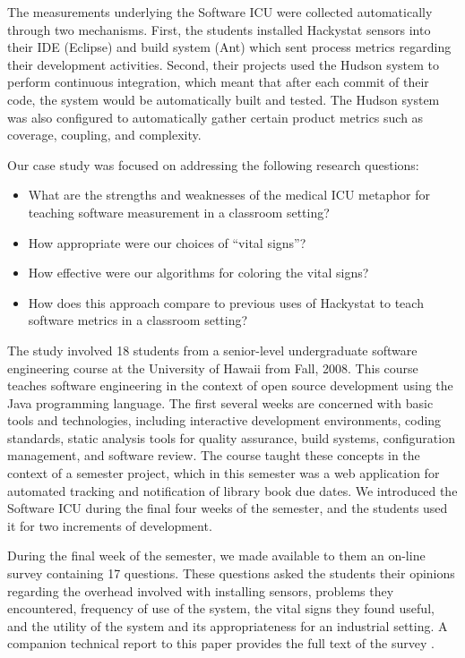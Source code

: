 \documentclass[times,10pt,twocolumn]{article}
\begin{document}
The measurements underlying the Software ICU were collected automatically
through two mechanisms. First, the students installed Hackystat sensors
into their IDE (Eclipse) and build system (Ant) which sent process
metrics regarding their development activities.  Second, their projects
used the Hudson system to perform continuous integration, which meant that
after each commit of their code, the system would be automatically built
and tested.  The Hudson system was also configured to automatically gather
certain product metrics such as coverage, coupling, and complexity.

\label{sec:evaluation}

Our case study was focused on addressing the following research questions: 
\begin{itemize}
\item What are the strengths and weaknesses of the medical ICU metaphor for 
teaching software measurement in a classroom setting? 
\item How appropriate were our choices of ``vital signs''?
\item How effective were our algorithms for coloring the vital signs? 
\item How does this approach compare to previous uses of Hackystat to teach software metrics
in a classroom setting? 
\end{itemize}

The study involved 18 students from a senior-level undergraduate software
engineering course at the University of Hawaii from Fall, 2008. This course
teaches software engineering in the context of open source development
using the Java programming language.  The first several weeks are concerned
with basic tools and technologies, including interactive development
environments, coding standards, static analysis tools for quality
assurance, build systems, configuration management, and software review.
The course taught these concepts in the context of a semester project,
which in this semester was a web application for automated tracking and
notification of library book due dates.  We introduced the Software ICU
during the final four weeks of the semester, and the students used it for
two increments of development.

During the final week of the semester, we made available to them an on-line
survey containing 17 questions.  These questions asked the students their
opinions regarding the overhead involved with installing sensors, problems
they encountered, frequency of use of the system, the vital signs they
found useful, and the utility of the system and its appropriateness for an
industrial setting.  A companion technical report to this paper provides
the full text of the survey \cite{csdl2-09-03}.
\end{document}
